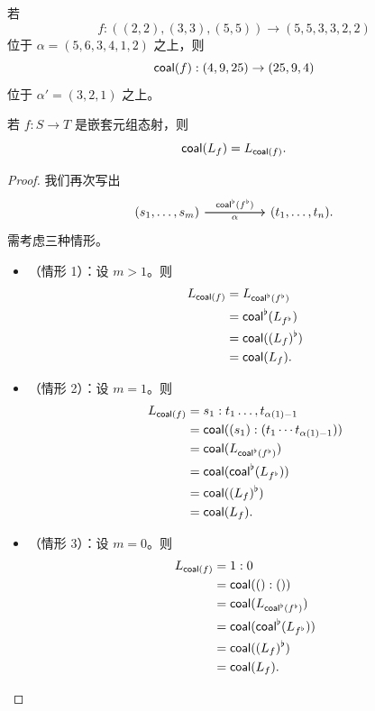 \begin{example}
    若
    \[f:((2,2),(3,3),(5,5)) \to (5,5,3,3,2,2)\]
    位于 $\alpha = (5,6,3,4,1,2)$ 之上，则
    \[
    \mathsf{coal}(f):(4,9,25) \to (25,9,4)
    \]
    位于 $\alpha' = (3,2,1)$ 之上。
\end{example}

\begin{proposition}\label{coalesceagreement}
    若 $f:S \to T$ 是嵌套元组态射，则
    \[
    \mathsf{coal}(L_f) = L_{\mathsf{coal}(f)}.
    \]
\end{proposition}

\begin{proof}
我们再次写出
    \[ \begin{tikzcd}
    (s_1,\dots,s_m) \ar[rr,"\coalesce^\flat(f^\flat)"] \ar[rr,swap,"\alpha"] & & (t_1,\dots,t_n).
    \end{tikzcd} \]
    需考虑三种情形。
    \begin{itemize}
        \item （情形 1）：设 $m > 1$。则
        \begin{align*}
        L_{\mathsf{coal}(f)} & = L_{\mathsf{coal}^\flat(f^\flat)}\\
        & = \mathsf{coal}^\flat(L_{f^\flat})\\
        & = \mathsf{coal}((L_f)^\flat)\\
        & = \mathsf{coal}(L_f).
    \end{align*}
    \item （情形 2）：设 $m = 1$。则
    \begin{align*}
        L_{\mathsf{coal}(f)} & = s_1:t_1 \dots,t_{\alpha(1)-1}\\
        & = \mathsf{coal}((s_1):(t_1\cdots
        t_{\alpha(1)-1}))\\
        &= \mathsf{coal}(L_{\mathsf{coal}^\flat(f^\flat)})\\
        & = \mathsf{coal}(\mathsf{coal}^\flat(L_{f^\flat}))\\
        & = \mathsf{coal}((L_f)^\flat)\\
        & = \mathsf{coal}(L_f).
    \end{align*}
    \item （情形 3）：设 $m = 0$。则
    \begin{align*}
        L_{\mathsf{coal}(f)} & = 1:0 \\
        & = \mathsf{coal}(():())\\
        &= \mathsf{coal}(L_{\mathsf{coal}^\flat(f^\flat)})\\
        & = \mathsf{coal}(\mathsf{coal}^\flat(L_{f^\flat}))\\
        & = \mathsf{coal}((L_f)^\flat)\\
        & = \mathsf{coal}(L_f).
    \end{align*}
    \end{itemize}

\end{proof}

